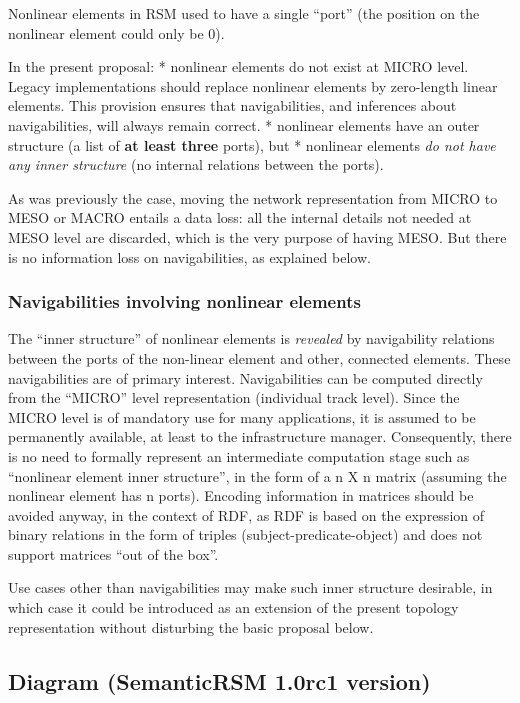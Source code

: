 \documentclass[
  11pt,
]{article}
\begin{document}
Nonlinear elements in RSM used to have a single ``port'' (the position
on the nonlinear element could only be 0).

In the present proposal: * nonlinear elements do not exist at MICRO
level. Legacy implementations should replace nonlinear elements by
zero-length linear elements. This provision ensures that navigabilities,
and inferences about navigabilities, will always remain correct. *
nonlinear elements have an outer structure (a list of \textbf{at least
three} ports), but * nonlinear elements \emph{do not have any inner
structure} (no internal relations between the ports).

As was previously the case, moving the network representation from MICRO
to MESO or MACRO entails a data loss: all the internal details not
needed at MESO level are discarded, which is the very purpose of having
MESO. But there is no information loss on navigabilities, as explained
below.

\hypertarget{navigabilities-involving-nonlinear-elements}{%
\subsubsection{Navigabilities involving nonlinear
elements}\label{navigabilities-involving-nonlinear-elements}}

The ``inner structure'' of nonlinear elements is \emph{revealed} by
navigability relations between the ports of the non-linear element and
other, connected elements. These navigabilities are of primary interest.
Navigabilities can be computed directly from the ``MICRO'' level
representation (individual track level). Since the MICRO level is of
mandatory use for many applications, it is assumed to be permanently
available, at least to the infrastructure manager. Consequently, there
is no need to formally represent an intermediate computation stage such
as ``nonlinear element inner structure'', in the form of a n X n matrix
(assuming the nonlinear element has n ports). Encoding information in
matrices should be avoided anyway, in the context of RDF, as RDF is
based on the expression of binary relations in the form of triples
(subject-predicate-object) and does not support matrices ``out of the
box''.

Use cases other than navigabilities may make such inner structure
desirable, in which case it could be introduced as an extension of the
present topology representation without disturbing the basic proposal
below.

\hypertarget{diagram-semanticrsm-1.0rc1-version}{%
\subsection{Diagram (SemanticRSM 1.0rc1
version)}\label{diagram-semanticrsm-1.0rc1-version}}
\end{document}
